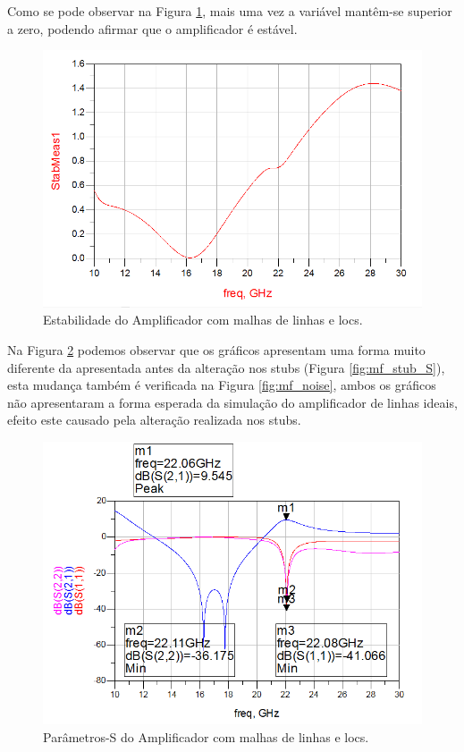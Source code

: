 \documentclass[11pt]{article}
\numberwithin{equation}{section}
\begin{document}
Como se pode observar na Figura \ref{fig:mf_est}, mais uma vez a variável mantêm-se superior a zero, podendo afirmar que o amplificador é estável.

\begin{figure}[H]
	\centering
	\includegraphics[keepaspectratio=true, scale=0.45]{exps/mf_estab}
	\vspace{-0.5em}
	\caption{Estabilidade do Amplificador com malhas de linhas e locs.}
	\vspace{-0.8em}
	\label{fig:mf_est}
\end{figure}

Na Figura \ref{fig:mf_S} podemos observar que os gráficos apresentam uma forma muito diferente da apresentada antes da alteração nos stubs (Figura \ref{fig:mf_stub_S}), esta mudança também é verificada na Figura \ref{fig:mf_noise}, ambos os gráficos não apresentaram a forma esperada da simulação do amplificador de linhas ideais, efeito este causado pela alteração realizada nos stubs.

\begin{figure}[H]
	\centering
	\includegraphics[keepaspectratio=true, scale=0.45]{exps/mf_S}
	\vspace{-0.5em}
	\caption{Parâmetros-S do Amplificador com malhas de linhas e locs.}
	\vspace{-0.8em}
	\label{fig:mf_S}
\end{figure}
\end{document}
